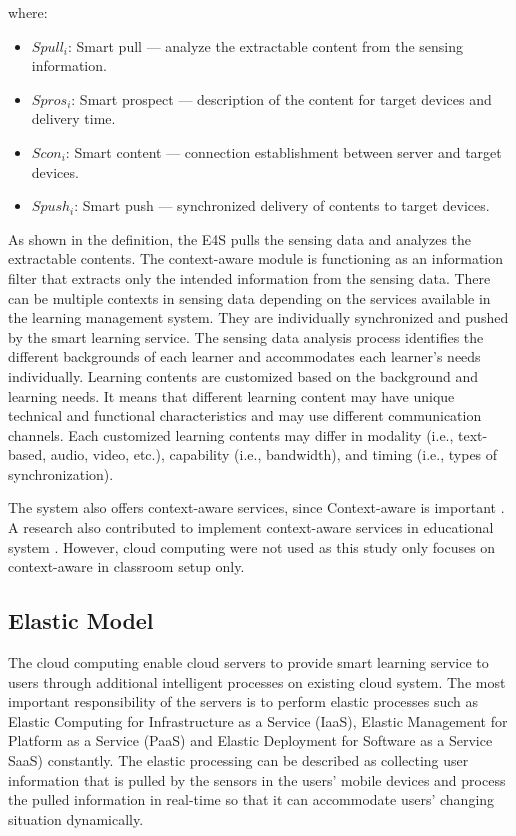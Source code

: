 \documentclass[journal]{vgtc}                %
\begin{document}
  where:

  \begin{itemize}
  \setlength\itemsep{0em}
    \item[] $Spull_i$: Smart pull $—$ analyze the extractable content from the sensing information. 
    \item[] $Spros_i$: Smart prospect $—$ description of the content for target devices and delivery time.
    \item[] $Scon_i$: Smart content $—$ connection establishment between server and target devices.
    \item[] $Spush_i$: Smart push $—$ synchronized delivery of contents to target devices.
  \end{itemize}

  As shown in the definition, the E4S pulls the sensing data and analyzes the extractable contents. The context-aware module is functioning as an information filter that extracts only the intended information from the sensing data. There can be multiple contexts in sensing data depending on the services available in the learning management system. They are individually synchronized and pushed by the smart learning service. The sensing data analysis process identifies the different backgrounds of each learner and accommodates each learner's needs individually. Learning contents are customized based on the background and learning needs. It means that different learning content may have unique technical and functional characteristics and may use different communication channels. Each customized learning contents may differ in modality (i.e., text-based, audio, video, etc.), capability (i.e., bandwidth), and timing (i.e., types of synchronization).

  The system also offers context-aware services, since Context-aware is important \cite{Pratama2014}. A research also contributed to implement context-aware services in educational system \cite{Scott2010}. However, cloud computing were not used as this study only focuses on context-aware in classroom setup only.

  \subsection{Elastic Model}
  The cloud computing enable cloud servers to provide smart learning service to users through additional intelligent processes on existing cloud system. The most important responsibility of the servers is to perform elastic processes such as Elastic Computing for Infrastructure as a Service (IaaS), Elastic Management for Platform as a Service (PaaS) and Elastic Deployment for Software as a Service SaaS) constantly. The elastic processing can be described as collecting user information that is pulled by the sensors in the users' mobile devices and process the pulled information in real-time so that it can accommodate users' changing situation dynamically.
\end{document}
